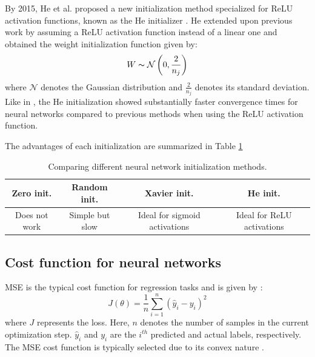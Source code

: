 By 2015, He et al. proposed a new initialization method specialized for ReLU activation functions, known as the He initializer \cite{he_init}. He extended upon previous work by assuming a ReLU activation function instead of a linear one and obtained the weight initialization function given by:
\begin{equation}
    W \thicksim \mathcal{N} \left(0, \frac{2}{n_j}  \right)
\end{equation}
where $\mathcal{N}$ denotes the Gaussian distribution and $\frac{2}{n_j}$ denotes its standard deviation.  Like in \cite{xavier_init}, the He initialization showed substantially faster convergence times for neural networks compared to previous methods when using the ReLU activation function.

The advantages of each initialization are summarized in Table \ref{tab:01nn_init}

\begin{table}[H]
\caption{Comparing different neural network initialization methods.}
\label{tab:01nn_init}
\centering
{\footnotesize
\begin{tabular}{c|c|c|c}
\textbf{Zero init.} & \textbf{Random init.}	& \textbf{Xavier init.} & \textbf{He init.}\\
\hline
Does not work	     	& Simple but slow			& Ideal for sigmoid activations &  Ideal for ReLU activations \\
\end{tabular}}
\end{table}




\subsection{Cost function for neural networks}
MSE is the typical cost function for regression tasks and is given by \cite{NN}:
\begin{equation}
    J(\theta) = \frac{1}{n}\sum\limits^n_{i=1}(\hat{y}_i - y_i)^2
    \label{eq:08MSE}
\end{equation}
where $J$ represents the loss.  Here, $n$ denotes the number of samples in the current optimization step. $\hat{y}_i$ and $y_i$ are the $i^{th}$ predicted and actual labels, respectively. The MSE cost function is typically selected due to its convex nature \cite{deeplearning_course}.


